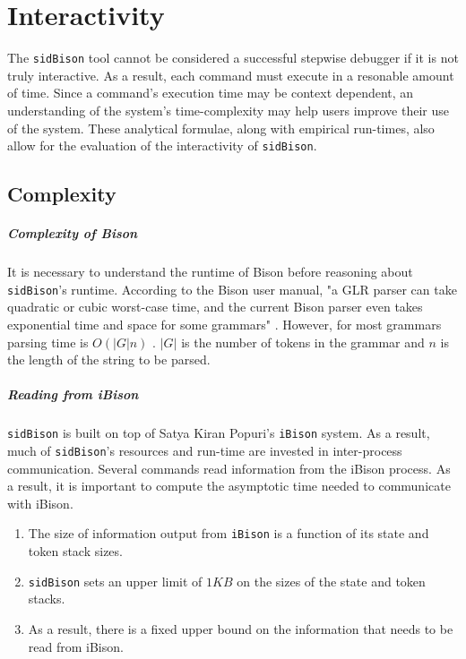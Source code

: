 \chapter{Interactivity}

The \verb|sidBison| tool cannot be considered a successful stepwise debugger if it is not truly interactive. As a result, each command must execute in a resonable amount of time. Since a command's execution time may be context dependent, an understanding of the system's time-complexity may help users improve their use of the system. These analytical formulae, along with empirical run-times,
also allow for the evaluation of the interactivity of \verb|sidBison|.

\section{Complexity}

\paragraph{Complexity of Bison}

It is necessary to understand the runtime of Bison before reasoning about \verb|sidBison|'s runtime. According to the Bison user manual, "a GLR parser can take quadratic or cubic worst-case time, and the current Bison parser even takes exponential time and space for some grammars" \cite{LinearBison}. However, for most grammars parsing time is $O(|G| n)$ \cite{LinearBison}\cite{ComplexityGLR}. $|G|$ is the number of tokens in the grammar and $n$ is the length of the string to be parsed.

\paragraph{Reading from iBison}

\verb|sidBison| is built on top of Satya Kiran Popuri's \verb|iBison| system. As a result, much of \verb|sidBison|'s resources and run-time are invested in inter-process communication. Several commands read information from the iBison process. As a result, it is important to compute the asymptotic time needed to communicate with iBison.

\begin{enumerate}
\item  The size of information output from \verb|iBison| is a function of its state and token stack sizes.
\item \verb|sidBison| sets an upper limit of $1 KB$ on the sizes of the state and token stacks.
\item As a result, there is a fixed upper bound on the information that needs to be read from iBison.
\end{enumerate}

